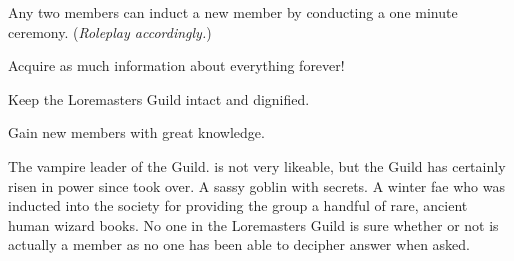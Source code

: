 \documentclass[blue]{guildcamp2}
\begin{document}
Any two members can induct a new member by conducting a one minute ceremony. (\emph{Roleplay accordingly.})



\begin{itemz}[Goals]
  \item Acquire as much information about everything forever!
  \item Keep the Loremasters Guild intact and dignified.
  \item Gain new members with great knowledge.
\end{itemz}


\begin{members}
  \member{\cVampire{}} The vampire leader of the Guild. \cVampire{\They} is not very likeable, but the Guild has certainly risen in power since \cVampire{\they} took over.
	\member{\cGoblin{}} A sassy goblin with secrets. 
	\member{\cBabyFae{}} A winter fae who was inducted into the society for providing the group a handful of rare, ancient human wizard books.
	\member{\cSphinx{}} No one in the Loremasters Guild is sure whether or not \cSphinx{} is actually a member as no one has been able to decipher \cSphinx{\their} answer when asked.
	
\end{members}
\end{document}
